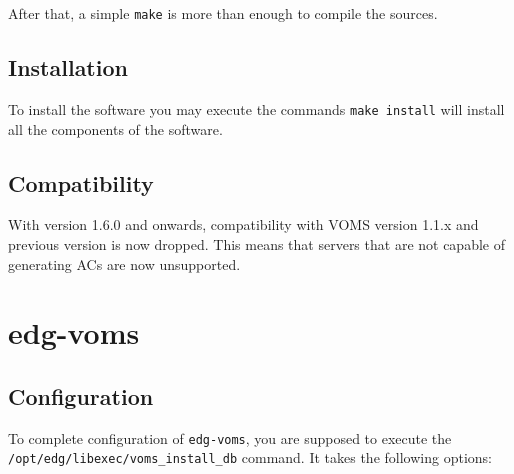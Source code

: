 \documentclass[a4paper]{book}
\begin{document}
After that, a simple \verb|make| is more than enough to compile the
sources.

\section{Installation}
To install the software you may execute the commands
\verb|make install| will install all the components of the software.

\section{Compatibility}
With version 1.6.0 and onwards, compatibility with VOMS version 1.1.x
and previous version is now dropped.  This means that servers that are
not capable of generating ACs are now unsupported.

\chapter{edg-voms}
\section{Configuration}
To complete configuration of \verb|edg-voms|, you are supposed to
execute the \newline\verb|/opt/edg/libexec/voms_install_db| command.  It takes
the following options:
\end{document}
